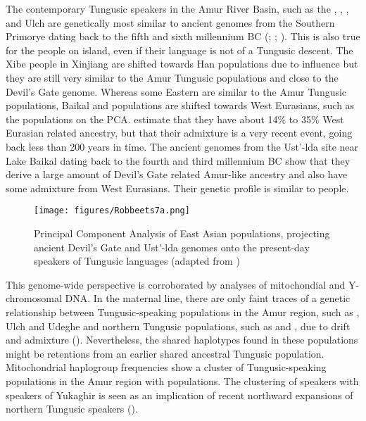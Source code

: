 \documentclass[output=paper,colorlinks,citecolor=brown]{langscibook}
\begin{document}
The contemporary Tungusic speakers in the Amur River Basin, such as the , , ,  and Ulch are genetically most similar to ancient genomes from the Southern Primorye dating back to the fifth and sixth millennium BC (\citealt{Siska2017}; \citealt{Wang2021}; \citealt{WangRobbeets2020}). This is also true for the  people on  island, even if their language is not of a Tungusic descent. The Xibe people in Xinjiang are shifted towards Han  populations due to  influence but they are still very similar to the Amur Tungusic populations and close to the Devil’s Gate genome. Whereas some Eastern  are similar to the Amur Tungusic populations, Baikal  and  populations are shifted towards West Eurasians, such as the   populations on the PCA. \citet{WangRobbeets2020} estimate that they have about 14\% to 35\% West Eurasian related ancestry, but that their admixture is a very recent event, going back less than 200 years in time.  The ancient genomes from the Ust’-lda site near Lake Baikal dating back to the fourth and third millennium BC show that they derive a large amount of Devil’s Gate related Amur-like ancestry and also have some admixture from West Eurasians. Their genetic profile is similar to  people.


\begin{figure}
\texttt{[image: figures/Robbeets7a.png]}
\caption{Principal Component Analysis of East Asian populations, projecting ancient Devil’s Gate and Ust’-lda genomes onto the present-day speakers of Tungusic languages (adapted from \citealt{WangRobbeets2020})}
\label{fig:8:7}
\end{figure}

This genome-wide perspective is corroborated by analyses of mitochondial and Y-chromosomal DNA.  In the maternal line, there are only faint traces of a genetic relationship between Tungusic-speaking populations in the Amur region, such as , Ulch and Udeghe and northern Tungusic populations, such as  and , due to drift and admixture (\citealt{Duggan2013}). Nevertheless, the shared haplotypes found in these populations might be retentions from an earlier shared ancestral Tungusic population. Mitochondrial haplogroup frequencies show a cluster of Tungusic-speaking populations in the Amur region with  populations. The clustering of  speakers with speakers of Yukaghir is seen as an implication of recent northward expansions of northern Tungusic speakers (\citealt{Sukernik2012}).
\end{document}
